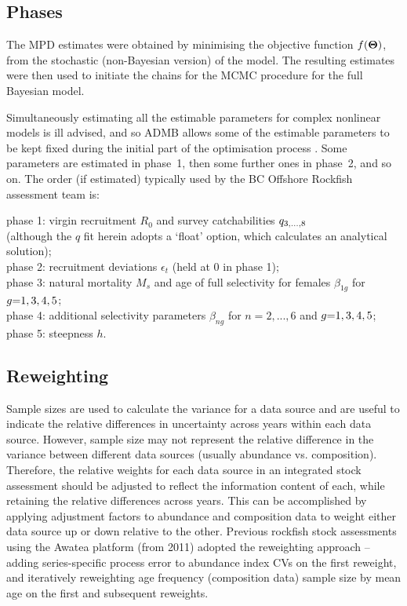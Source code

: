 \documentclass[11pt]{book}
\def\bfTh{{\bf \Theta}}%
\def\bfTh{{\bf \Theta}}          %
\def\hsd{\hspace*{1ex}}
\begin{document}
\subsection{Phases}

The MPD estimates were obtained by minimising the objective function $f(\bfTh)$, from the stochastic (non-Bayesian version) of the model. 
The resulting estimates were then used to initiate the chains for the MCMC procedure for the full Bayesian model.

Simultaneously estimating all the estimable parameters for complex nonlinear models is ill advised, and so ADMB allows some of the estimable parameters to be kept fixed during the initial part of the optimisation process \citet{ADMB:2009}. 
Some parameters are estimated in phase~1, then some further ones in phase~2, and so on. 
The order (if estimated) typically used by the BC Offshore Rockfish assessment team is:

\begin{changemargin}{0.25in}{0.25in}{0.5ex}
phase 1: virgin recruitment $R_0$ and survey catchabilities $q_{3,...,8}$\\
  \hsd (although the $q$ fit herein adopts a `float' option, which calculates an analytical solution);\\
phase 2: recruitment deviations $\epsilon_t$ (held at 0 in phase 1);\\
phase 3: natural mortality $M_{s}$ and age of full selectivity for females $\beta_{1g}$ for $g{=}1,3,4,5$;\\
phase 4: additional selectivity parameters $\beta_{ng}$ for $n{=}2,...,6$ and $g{=}1,3,4,5$;\\
phase 5: steepness $h$.
\end{changemargin}

\subsection{Reweighting} \label{ss:reweight}

Sample sizes are used to calculate the variance for a data source and are useful to indicate the relative differences in uncertainty across years within each data source.
However, sample size may not represent the relative difference in the variance between different data sources (usually abundance vs. composition).
Therefore, the relative weights for each data source in an integrated stock assessment should be adjusted to reflect the information content of each, while retaining the relative differences across years.
This can be accomplished by applying adjustment factors to abundance and composition data to weight either data source up or down relative to the other.
Previous rockfish stock assessments using the Awatea platform (from 2011) adopted the \citet{Francis:2011} reweighting approach -- adding series-specific process error to abundance index CVs on the first reweight, and iteratively reweighting age frequency (composition data) sample size by mean age on the first and subsequent reweights.
\end{document}
